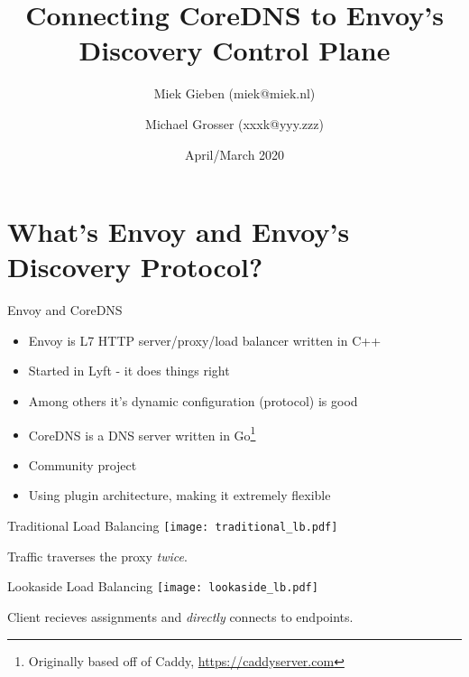 \documentclass[aspectratio=169]{beamer}
\title{Connecting CoreDNS to Envoy's Discovery Control Plane}
\date{April/March 2020}
\author{Miek Gieben (miek@miek.nl) \and Michael Grosser (xxxk@yyy.zzz)}
\institute{Centre for protobuf Nerding}
\begin{document}
    \let\oldfootnotesize\footnotesize
    \renewcommand*{\footnotesize}{\oldfootnotesize\tiny}

    \maketitle

    \section{What's Envoy and Envoy's Discovery Protocol?}
    \begin{frame}{Envoy and CoreDNS}
        \begin{itemize}
            \item Envoy is L7 HTTP server/proxy/load balancer written in C++
            \item Started in Lyft - it does things right
            \item Among others it's dynamic configuration (protocol) is good
        \end{itemize}

        \begin{itemize}
            \item CoreDNS is a DNS server written in Go\footnote{Originally based off of Caddy, \url{https://caddyserver.com}}
            \item Community project
            \item Using plugin architecture, making it extremely flexible
        \end{itemize}
    \end{frame}

    \begin{frame}{Traditional Load Balancing}
        \texttt{[image: traditional\_lb.pdf]}

        Traffic traverses the proxy \emph{twice}.
    \end{frame}

    \begin{frame}{Lookaside Load Balancing}
        \texttt{[image: lookaside\_lb.pdf]}

        Client recieves assignments and \emph{directly} connects to endpoints.
    \end{frame}
\end{document}
